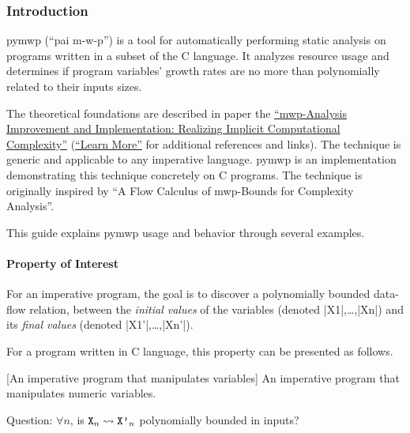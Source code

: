 \subsubsection{Introduction}
\label{guide-introduction}

pymwp (\enquote{pai m-w-p}) is a tool for automatically performing static analysis on programs written in a subset of the C language.
It analyzes resource usage and determines if program variables' growth rates are no more than polynomially related to their inputs sizes.

The theoretical foundations are described in paper the \hyperref[sec:fscd]{\enquote{mwp-Analysis Improvement and Implementation: Realizing Implicit Computational Complexity}} (\cf \hyperref[guide-learn-more]{\enquote{Learn More}} for additional references and links).
The technique is generic and applicable to any imperative language.
pymwp is an implementation demonstrating this technique concretely on C programs.
The technique is originally inspired by \enquote{A Flow Calculus of mwp-Bounds for Complexity Analysis}.

This guide explains pymwp usage and behavior through several examples.

\paragraph*{Property of Interest}

For an imperative program, the goal is to discover a polynomially bounded data-flow relation, between the \emph{initial values} of the variables (denoted \pr|X1|,\ldots{},\pr|Xn|) and its \emph{final values} (denoted \pr|X1'|,\ldots{},\pr|Xn'|).

For a program written in C language, this property can be presented as follows.

\begin{center}
\begin{minipage}{\textwidth}
\captionsetup{type=lstlisting}
[An imperative program that manipulates variables]
{An imperative program that manipulates numeric variables.}
\label{lst:guide}
\end{minipage}
\end{center}

Question: \(\forall n\), is \(\prm{X}_n \rightsquigarrow \prm{X'}_n\) polynomially bounded in inputs?


